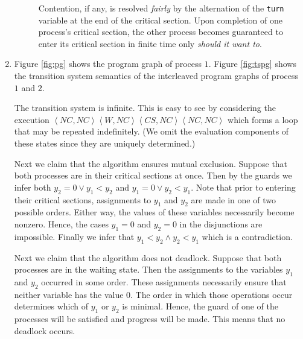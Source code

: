 \documentclass[11pt,letterpaper]{article}
\newcommand{\state}[1]{\left\langle #1 \right\rangle}
\begin{document}
\begin{enumerate}
\begin{description}
                Contention, if any, is resolved \emph{fairly} by the
                alternation of the \texttt{turn} variable at the end of the
                critical section. Upon completion of one process's critical
                section, the other process becomes guaranteed to enter its
                critical section in finite time only \emph{should it want to}.
        \end{description}

    \item
        Figure \ref{fig:pg} shows the program graph of process $1$. Figure
        \ref{fig:tspg} shows the transition system semantics of the
        interleaved program graphs of process $1$ and $2$.

        The transition system is infinite. This is easy to see by considering
        the execution $\state{NC,NC}\state{W,NC}\state{CS,NC}\state{NC,NC}$
        which forms a loop that may be repeated indefinitely. (We omit the
        evaluation components of these states since they are uniquely
        determined.)

        Next we claim that the algorithm ensures mutual exclusion. Suppose that
        both processes are in their critical sections at once. Then by the
        guards we infer both $y_2 = 0 \lor y_1 < y_2$
        and $y_1 = 0 \lor y_2 < y_1$. Note that prior to entering their
        critical sections, assignments to $y_1$ and $y_2$ are made in one of
        two possible orders. Either way, the values of these variables
        necessarily become nonzero. Hence, the cases $y_1 = 0$ and $y_2 = 0$ in
        the disjunctions are impossible. Finally we infer that $y_1 < y_2
        \land y_2 < y_1$ which is a contradiction.

        Next we claim that the algorithm does not deadlock. Suppose that both
        processes are in the waiting state. Then the assignments to the
        variables $y_1$ and $y_2$ occurred in some order. These assignments
        necessarily ensure that neither variable has the value $0$. The order
        in which those operations occur determines which of $y_1$ or $y_2$ is
        minimal. Hence, the guard of one of the processes will be satisfied and
        progress will be made. This means that no deadlock occurs.


\end{enumerate}
\end{document}
